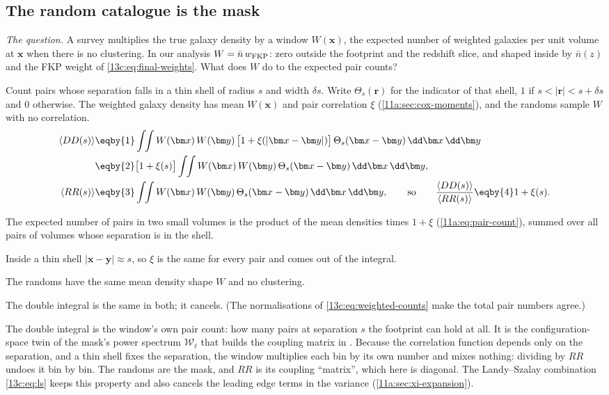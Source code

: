 \subsection{The random catalogue is the mask}
\label{13c:sec:window}

\emph{The question.} A survey multiplies the true galaxy density by a window
$W(\bm x)$, the expected number of weighted galaxies per unit volume at $\bm x$ when
there is no clustering. In our analysis $W=\bar n\,w_{\rm FKP}$: zero outside the
footprint and the redshift slice, and shaped inside by $\bar n(z)$ and the FKP weight of
\eqref{13c:eq:final-weights}. What does $W$ do to the expected pair counts?

Count pairs whose separation falls in a thin shell of radius $s$ and width $\delta s$.
Write $\Theta_s(\bm r)$ for the indicator of that shell, $1$ if $s<|\bm r|<s+\delta s$
and $0$ otherwise. The weighted galaxy density has mean $W(\bm x)$ and pair correlation
$\xi$ (\cref{11a:sec:cox-moments}), and the randoms sample $W$ with no correlation.
\begin{align}
  \langle DD(s)\rangle
  &\eqby{1}\int\!\!\int W(\bm x)\,W(\bm y)\,\bigl[1+\xi(|\bm x-\bm y|)\bigr]\,
   \Theta_s(\bm x-\bm y)\,\dd\bm x\,\dd\bm y
  \nonumber\\
  &\eqby{2}\bigl[1+\xi(s)\bigr]\int\!\!\int W(\bm x)\,W(\bm y)\,
   \Theta_s(\bm x-\bm y)\,\dd\bm x\,\dd\bm y ,
  \nonumber\\
  \langle RR(s)\rangle
  &\eqby{3}\int\!\!\int W(\bm x)\,W(\bm y)\,\Theta_s(\bm x-\bm y)\,\dd\bm x\,\dd\bm y,
  \qquad\text{so}\qquad
  \frac{\langle DD(s)\rangle}{\langle RR(s)\rangle}\eqby{4}1+\xi(s).
  \label{13c:eq:window-ratio}
\end{align}
\begin{explain}
  \item The expected number of pairs in two small volumes is the product of the mean
        densities times $1+\xi$ (\cref{11a:eq:pair-count}), summed over all pairs of
        volumes whose separation is in the shell.
  \item Inside a thin shell $|\bm x-\bm y|\approx s$, so $\xi$ is the same for every
        pair and comes out of the integral.
  \item The randoms have the same mean density shape $W$ and no clustering.
  \item The double integral is the same in both; it cancels. (The normalisations of
        \eqref{13c:eq:weighted-counts} make the total pair numbers agree.)
\end{explain}
The double integral is the window's own pair count: how many pairs at separation $s$
the footprint can hold at all. It is the configuration-space twin of the mask's power
spectrum $\mathcal W_\ell$ that builds the coupling matrix in
. Because the correlation function depends only on the separation,
and a thin shell fixes the separation, the window multiplies each bin by its own
number and mixes nothing: dividing by $RR$ undoes it bin by bin. The randoms are the
mask, and $RR$ is its coupling ``matrix'', which here is diagonal. The Landy--Szalay
combination \eqref{13c:eq:ls} keeps this property and also cancels the leading edge
terms in the variance (\cref{11a:sec:xi-expansion}).

